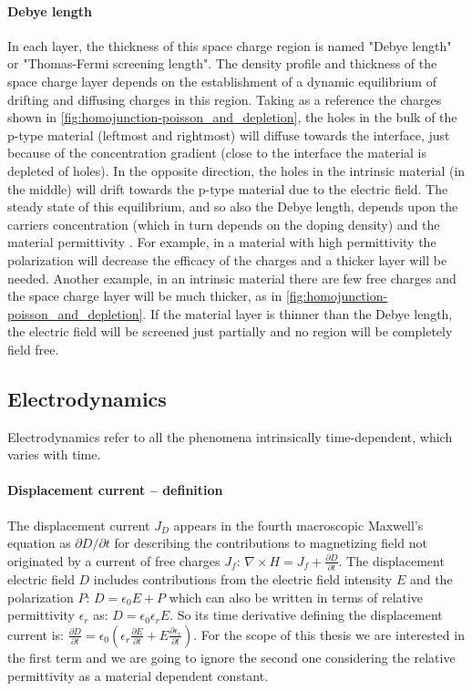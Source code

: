 		\paragraph{Debye length}\label{intro-debye_length}
		In each layer, the thickness of this space charge region is named "Debye length" or "Thomas\hyp{}Fermi screening length".
The density profile and thickness of the space charge layer depends on the establishment of a dynamic equilibrium of drifting and diffusing charges in this region.
Taking as a reference the charges shown in \cref{fig:homojunction-poisson_and_depletion}, the holes in the bulk of the p-type material (leftmost and rightmost) will diffuse towards the interface, just because of the concentration gradient (close to the interface the material is depleted of holes).
In the opposite direction, the holes in the intrinsic material (in the middle) will drift towards the p-type material due to the electric field.
The steady state of this equilibrium, and so also the Debye length, depends upon the carriers concentration (which in turn depends on the doping density) and the material permittivity \cite{WikipediaDebye2019}.
		For example, in a material with high permittivity the polarization will decrease the efficacy of the charges and a thicker layer will be needed.
		Another example, in an intrinsic material there are few free charges and the space charge layer will be much thicker, as in \cref{fig:homojunction-poisson_and_depletion}.
If the material layer is thinner than the Debye length, the electric field will be screened just partially and no region will be completely field free.
		
	\subsection{Electrodynamics}
	Electrodynamics refer to all the phenomena intrinsically time-dependent, which varies with time.

		\paragraph{Displacement current -- definition}\label{intro_displacement_current}
		The displacement current $J_D$ appears in the fourth macroscopic Maxwell's equation as $\partial D / \partial t$ for describing the contributions to magnetizing field not originated by a current of free charges $J_f$: $\nabla \times H = J_f + \frac{\partial D}{\partial t}$.
		The displacement electric field $D$ includes contributions from the electric field intensity $E$ and the polarization $P$: $D=\epsilon_0 E + P$ which can also be written in terms of relative permittivity $\epsilon_r$ as: $D= \epsilon_0 \epsilon_r E$.
		So its time derivative defining the displacement current is: $\frac{\partial D}{\partial t} = \epsilon_0 (\epsilon_r\frac{\partial E}{\partial t} + E\frac{\partial \epsilon_r}{\partial t})$.
		For the scope of this thesis we are interested in the first term and we are going to ignore the second one considering the relative permittivity as a material dependent constant.


